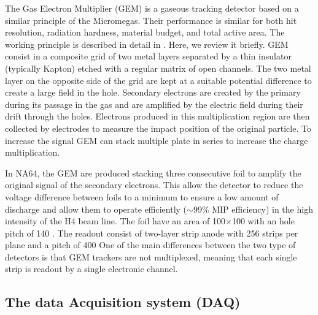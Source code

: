   The Gas Electron Multiplier (GEM) is a gaseous tracking detector based on a similar principle of the Micromegas. Their performance is similar for both hit resolution, radiation hardness, material budget, and total active area. The working principle is described in detail in \cite{gem,SAULI20162,ABBON2007455}. Here, we review it briefly. GEM consist in a composite grid of two metal layers separated by a thin insulator (typically Kapton) etched with a regular matrix of open channels. The two metal layer on the opposite side of the grid are kept at a suitable potential difference to create a large field in the hole. Secondary electrons are created by the primary during its passage in the gas and are amplified by the electric field during their drift through the holes. Electrons produced in this multiplication region are then collected by electrodes to measure the impact position of the original particle. To increase the signal GEM can stack multiple plate in series to increase the charge multiplication.

  In NA64, the GEM are produced stacking three consecutive foil to amplify the original signal of the secondary electrons. This allow the detector to reduce the voltage difference between foils to a minimum to ensure a low amount of discharge and allow them to operate efficiently ($\sim$99\% MIP efficiency) in the high intensity of the H4 beam line. The foil have an area of 100$\times$100 \mms with an hole pitch of 140 \mum. The readout consist of two-layer strip anode with 256 strips per plane and a pitch of 400 \mum 
  One of the main differences between the two type of detectors is that GEM trackers are not multiplexed, meaning that each single strip is readout by a single electronic channel.

\subsection{The data Acquisition system (DAQ)}
\label{chapter2:sec:daq}

